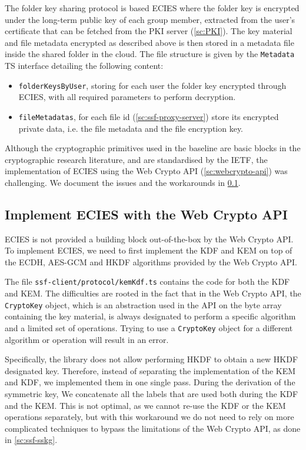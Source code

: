 The folder key sharing protocol is based ECIES where the folder key
is encrypted under the long-term public key of each group member,
extracted from the user's certificate that can be fetched
from the PKI server (\cref{sc:PKI}).
The key material and file metadata encrypted as described above is
then stored in a metadata file inside the shared folder in the cloud.
The file structure is given by the \texttt{Metadata} TS interface
detailing the following content:
\begin{itemize}
    \item \texttt{folderKeysByUser}, storing for each user the folder key encrypted through ECIES, with all required parameters to perform decryption.
    \item \texttt{fileMetadatas}, for each file id (\cref{sc:ssf-proxy-server}) store its encrypted private data, i.e. the file metadata and the file encryption key.
\end{itemize}

Although the cryptographic primitives used in the baseline are
basic blocks in the cryptographic research literature,
and are standardised by the IETF, the implementation of
ECIES using the Web Crypto API (\cref{sc:webcrypto-api}) was challenging.
We document the issues and the workarounds in \cref{sc:implement-ecies}.

\subsection{Implement ECIES with the Web Crypto API}\label{sc:implement-ecies}

ECIES is not provided a building block out-of-the-box by the Web Crypto API.
To implement ECIES, we need to first implement 
the KDF and KEM on top of the ECDH, AES-GCM and HKDF algorithms provided
by the Web Crypto API.

The file \texttt{ssf-client/protocol/kemKdf.ts} contains the code for both the KDF and KEM.
The difficulties are rooted in the fact that
in the Web Crypto API, the \texttt{CryptoKey}
object, which is an abstraction used in the API on the byte array containing the key material,
is always designated to perform a specific algorithm and
a limited set of operations.
Trying to use a \texttt{CryptoKey} object for a different algorithm or operation
will result in an error.

Specifically, the library does not allow performing 
HKDF to obtain a new HKDF designated key.
Therefore, instead of separating the implementation
of the KEM and KDF, we implemented them in one single pass.
During the derivation of the symmetric key,
We concatenate all the labels that are used both
during the KDF and the KEM. This is not optimal,
as we cannot re-use the KDF or the KEM operations
separately, but with this workaround we do not need
to rely on more complicated techniques 
to bypass the limitations of the Web Crypto API,
as done in \cref{sc:ssf-sskg}.

